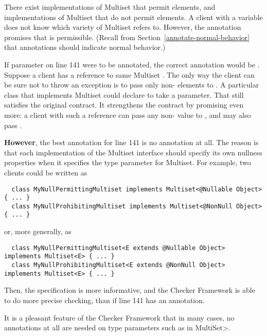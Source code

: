 There exist implementations of Multiset that permit  elements,
and implementations of Multiset that do not permit  elements.  A
client with a variable  does not know which variety of
Multiset  refers to.  However, the  annotation
promises that  is permissible.  (Recall from
Section~\ref{annotate-normal-behavior} that annotations should indicate
normal behavior.)

If parameter  on line 141 were to be annotated, the correct
annotation would be .  Suppose a client has a reference to
same Multiset .  The only way the client can be sure not to throw an exception is to pass
only non- elements to .  A particular class
that implements Multiset could declare  to take a
 parameter.  That still satisfies the original contract.
It strengthens the contract by promising even more:  a client with such a
reference can pass any non- value to , and may also
pass .

\textbf{However}, the best annotation for line 141 is no annotation at all.
The reason is that each implementation of the Multiset interface should
specify its own nullness properties when it specifies the type parameter
for Multiset.  For example, two clients could be written as

\begin{Verbatim}
  class MyNullPermittingMultiset implements Multiset<@Nullable Object> { ... }
  class MyNullProhibitingMultiset implements Multiset<@NonNull Object> { ... }
\end{Verbatim}

\noindent
or, more generally, as

\begin{Verbatim}
  class MyNullPermittingMultiset<E extends @Nullable Object> implements Multiset<E> { ... }
  class MyNullProhibitingMultiset<E extends @NonNull Object> implements Multiset<E> { ... }
\end{Verbatim}

Then, the specification is more informative, and the Checker Framework is
able to do more precise checking, than if line 141 has an annotation.

It is a pleasant feature of the Checker Framework that in many cases, no
annotations at all are needed on type parameters such as  in \<MultiSet>.



